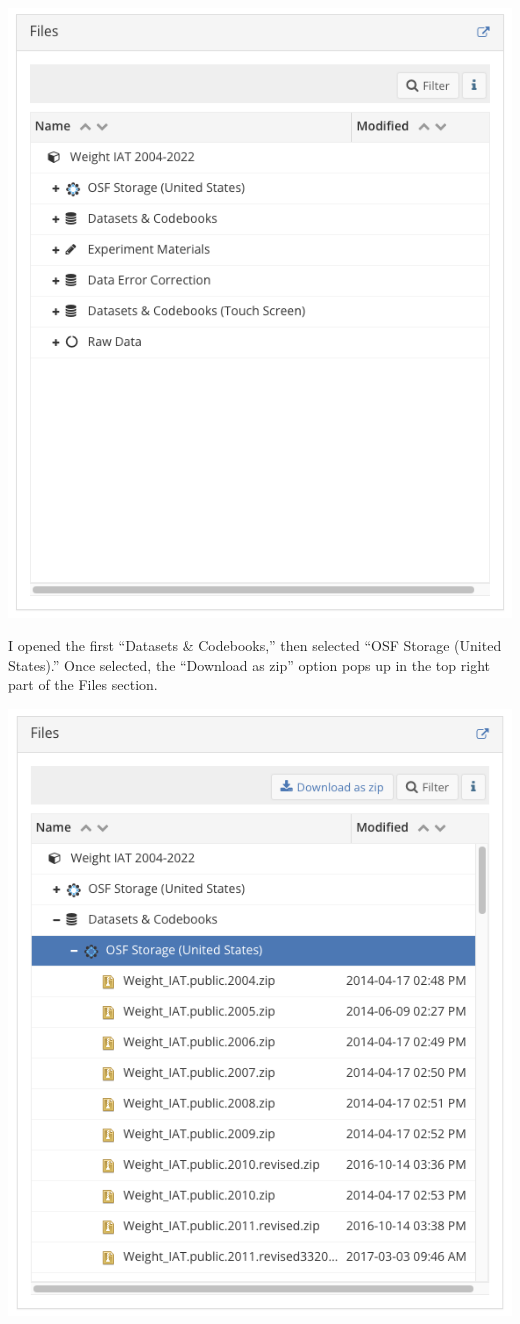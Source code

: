 \documentclass[
  letterpaper,
  DIV=11,
  numbers=noendperiod]{scrartcl}
\begin{document}
\includegraphics{images/data_access_1.png}

I opened the first ``Datasets \& Codebooks,'' then selected ``OSF
Storage (United States).'' Once selected, the ``Download as zip'' option
pops up in the top right part of the Files section.

\includegraphics{images/data_access_2.png}
\end{document}
